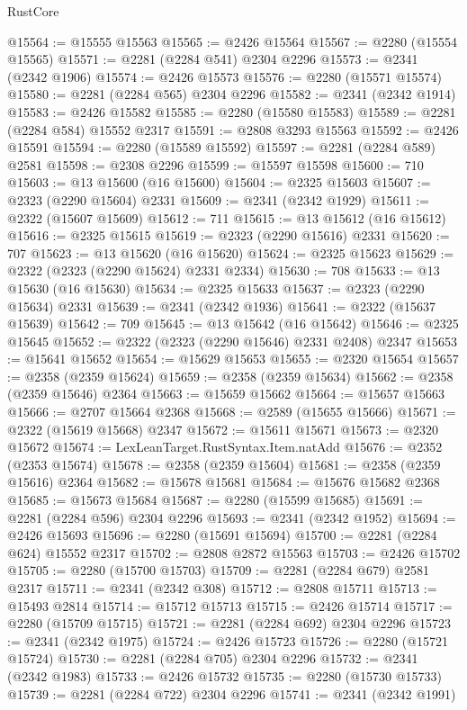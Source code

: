 \begin{lexlean}{RustCore}
\begin{coremodule}
@15564 := @15555 @15563
@15565 := @2426 @15564
@15567 := @2280 (@15554 @15565)
@15571 := @2281 (@2284 @541) @2304 @2296
@15573 := @2341 (@2342 @1906)
@15574 := @2426 @15573
@15576 := @2280 (@15571 @15574)
@15580 := @2281 (@2284 @565) @2304 @2296
@15582 := @2341 (@2342 @1914)
@15583 := @2426 @15582
@15585 := @2280 (@15580 @15583)
@15589 := @2281 (@2284 @584) @15552 @2317
@15591 := @2808 @3293 @15563
@15592 := @2426 @15591
@15594 := @2280 (@15589 @15592)
@15597 := @2281 (@2284 @589) @2581
@15598 := @2308 @2296
@15599 := @15597 @15598
@15600 := 710
@15603 := @13 @15600 (@16 @15600)
@15604 := @2325 @15603
@15607 := @2323 (@2290 @15604) @2331
@15609 := @2341 (@2342 @1929)
@15611 := @2322 (@15607 @15609)
@15612 := 711
@15615 := @13 @15612 (@16 @15612)
@15616 := @2325 @15615
@15619 := @2323 (@2290 @15616) @2331
@15620 := 707
@15623 := @13 @15620 (@16 @15620)
@15624 := @2325 @15623
@15629 := @2322 (@2323 (@2290 @15624) @2331 @2334)
@15630 := 708
@15633 := @13 @15630 (@16 @15630)
@15634 := @2325 @15633
@15637 := @2323 (@2290 @15634) @2331
@15639 := @2341 (@2342 @1936)
@15641 := @2322 (@15637 @15639)
@15642 := 709
@15645 := @13 @15642 (@16 @15642)
@15646 := @2325 @15645
@15652 := @2322 (@2323 (@2290 @15646) @2331 @2408) @2347
@15653 := @15641 @15652
@15654 := @15629 @15653
@15655 := @2320 @15654
@15657 := @2358 (@2359 @15624)
@15659 := @2358 (@2359 @15634)
@15662 := @2358 (@2359 @15646) @2364
@15663 := @15659 @15662
@15664 := @15657 @15663
@15666 := @2707 @15664 @2368
@15668 := @2589 (@15655 @15666)
@15671 := @2322 (@15619 @15668) @2347
@15672 := @15611 @15671
@15673 := @2320 @15672
@15674 := LexLeanTarget.RustSyntax.Item.natAdd
@15676 := @2352 (@2353 @15674)
@15678 := @2358 (@2359 @15604)
@15681 := @2358 (@2359 @15616) @2364
@15682 := @15678 @15681
@15684 := @15676 @15682 @2368
@15685 := @15673 @15684
@15687 := @2280 (@15599 @15685)
@15691 := @2281 (@2284 @596) @2304 @2296
@15693 := @2341 (@2342 @1952)
@15694 := @2426 @15693
@15696 := @2280 (@15691 @15694)
@15700 := @2281 (@2284 @624) @15552 @2317
@15702 := @2808 @2872 @15563
@15703 := @2426 @15702
@15705 := @2280 (@15700 @15703)
@15709 := @2281 (@2284 @679) @2581 @2317
@15711 := @2341 (@2342 @308)
@15712 := @2808 @15711
@15713 := @15493 @2814
@15714 := @15712 @15713
@15715 := @2426 @15714
@15717 := @2280 (@15709 @15715)
@15721 := @2281 (@2284 @692) @2304 @2296
@15723 := @2341 (@2342 @1975)
@15724 := @2426 @15723
@15726 := @2280 (@15721 @15724)
@15730 := @2281 (@2284 @705) @2304 @2296
@15732 := @2341 (@2342 @1983)
@15733 := @2426 @15732
@15735 := @2280 (@15730 @15733)
@15739 := @2281 (@2284 @722) @2304 @2296
@15741 := @2341 (@2342 @1991)

\end{coremodule}
\end{lexlean}
